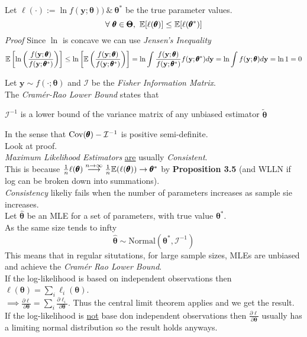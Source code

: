 \documentclass[11pt,a4paper]{article}
\begin{document}
Let $\ell(\cdot):=\ln f(\textbf{y};\pmb\theta))\ \&\ \pmb\theta^*$ be the true parameter values.
$$\forall\ \pmb\theta\in\pmb\Theta,\ \expect[\ell(\pmb\theta)]\leq\expect[\ell(\pmb\theta^*)]$$
\textit{Proof}
Since $\ln$ is concave we can use \textit{Jensen's Inequality}
$$\mathbb{E}\left[\ln\left(\dfrac{f(\textbf{y};\pmb\theta)}{f(\textbf{y};\pmb\theta^*)}\right)\right]\leq\ln\left[\mathbb{E}\left(\dfrac{f(\textbf{y};\pmb\theta)}{f(\textbf{y};\pmb\theta^*)}\right)\right]=\ln\int\dfrac{f(\textbf{y};\pmb\theta)}{f(\textbf{y};\pmb\theta^*)}f(\textbf{y};\pmb\theta^*)d\textbf{y}=\ln\int f(\textbf{y};\pmb\theta)d\textbf{y}=\ln1=0$$
\proved

Let $\textbf{y}\sim f(\cdot;\pmb\theta)$ and $\mathcal{I}$ be the \textit{Fisher Information Matrix}.\\
The \textit{Cram\'er-Rao Lower Bound} states that
\begin{center}$\mathcal{I}^{-1}$ is a lower bound of the variance matrix of any unbiased estimator $\tilde{\pmb\theta}$ \end{center}
In the sense that $\mathrm{Cov}(\pmb\theta)-\mathcal{I}^{-1}$ is positive semi-definite.\\
\nb Look at proof.\\

\textit{Maximum Likelihood Estimators} \underline{are} usually \textit{Consistent}.\\
This is because $\frac1n\ell(\pmb\theta)\overset{n\to\infty}{\longrightarrow}\frac{1}{n}\mathbb{E}(\ell(\pmb\theta))\to\pmb\theta^*$ by \textbf{Proposition 3.5} (and WLLN if log can be broken down into summations).\\
\nb \textit{Consistency} likeliy fails when the number of parameters increases as sample sie increases.\\

Let $\hat{\pmb\theta}$ be an MLE for a set of parameters, with true value $\pmb\theta^*$.\\
As the same size tends to infty
$$\hat{\pmb\theta}\sim\text{Normal}(\pmb\theta^*,\mathcal{I}^{-1})$$
This means that in regular situtations, for large sample sizes, MLEs are unbiased and achieve the \textit{Cram\'er Rao Lower Bound}.\\

If the log-likelihood is based on independent observations then $\ell(\pmb\theta)=\sum_i\ell_i(\pmb\theta)$.\\
$\implies\frac{\partial\ell}{\partial\pmb\theta}=\sum_i\frac{\partial\ell_i}{\partial\pmb\theta}$.
Thus the central limit theorem applies and we get the result.\\
If the log-likelihood is \underline{not} base don independent observations then $\frac{\partial\ell}{\partial\pmb\theta}$ usually has a limiting normal distribution so the result holds anyways.
\end{document}
